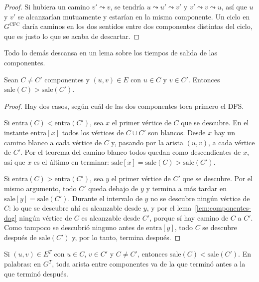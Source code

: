 \documentclass[11pt,letterpaper]{article}
\begin{document}
\begin{proof}
  Si hubiera un camino $v' \leadsto v$, se tendría
  $u \leadsto u' \leadsto v'$ y $v' \leadsto v \leadsto u$, así que $u$
  y $v'$ se alcanzarían mutuamente y estarían en la misma componente.
  Un ciclo en $G^{\text{CFC}}$ daría caminos en los dos sentidos entre
  dos componentes distintas del ciclo, que es justo lo que se acaba de
  descartar.
\end{proof}

Todo lo demás descansa en un lema sobre los tiempos de salida de las
componentes.

\begin{lema}
  \label{lem:sale-componentes}
  Sean $C \neq C'$ componentes y $(u, v) \in E$ con $u \in C$ y
  $v \in C'$. Entonces $\text{sale}(C) > \text{sale}(C')$.
\end{lema}

\begin{proof}
  Hay dos casos, según cuál de las dos componentes toca primero el
  DFS.

  Si $\text{entra}(C) < \text{entra}(C')$, sea $x$ el primer vértice
  de $C$ que se descubre. En el instante $\text{entra}[x]$ todos los
  vértices de $C \cup C'$ son blancos. Desde $x$ hay un camino blanco a
  cada vértice de $C$ y, pasando por la arista $(u, v)$, a cada vértice
  de $C'$. Por el teorema del camino blanco todos quedan como
  descendientes de $x$, así que $x$ es el último en terminar:
  $\text{sale}[x] = \text{sale}(C) > \text{sale}(C')$.

  Si $\text{entra}(C) > \text{entra}(C')$, sea $y$ el primer vértice
  de $C'$ que se descubre. Por el mismo argumento, todo $C'$ queda
  debajo de $y$ y termina a más tardar en $\text{sale}[y] =
  \text{sale}(C')$. Durante el intervalo de $y$ no se descubre ningún
  vértice de $C$: lo que se descubre ahí es alcanzable desde $y$, y por
  el lema~\ref{lem:componentes-dag} ningún vértice de $C$ es
  alcanzable desde $C'$, porque sí hay camino de $C$ a $C'$. Como
  tampoco se descubrió ninguno antes de $\text{entra}[y]$, todo $C$ se
  descubre después de $\text{sale}(C')$ y, por lo tanto, termina
  después.
\end{proof}

\begin{corolario}
  \label{cor:sale-transpuesto}
  Si $(u, v) \in E^T$ con $u \in C$, $v \in C'$ y $C \neq C'$,
  entonces $\text{sale}(C) < \text{sale}(C')$. En palabras: en $G^T$,
  toda arista entre componentes va de la que terminó antes a la que
  terminó después.
\end{corolario}
\end{document}
